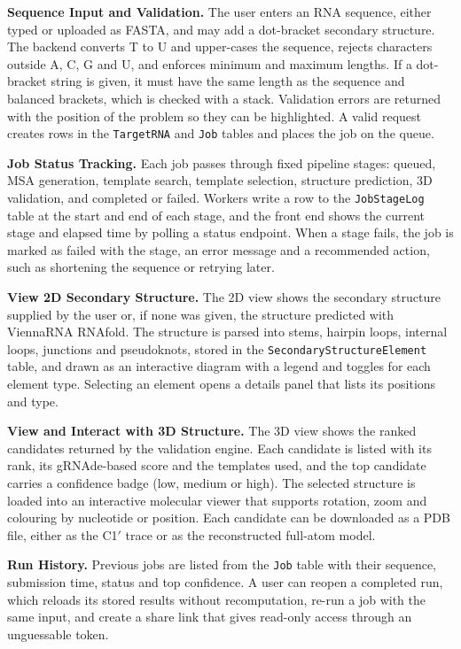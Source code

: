 \documentclass{FastFyp}
\begin{document}
\textbf{Sequence Input and Validation.} The user enters an RNA sequence, either typed or uploaded as FASTA, and may add a dot-bracket secondary structure. The backend converts T to U and upper-cases the sequence, rejects characters outside A, C, G and U, and enforces minimum and maximum lengths. If a dot-bracket string is given, it must have the same length as the sequence and balanced brackets, which is checked with a stack. Validation errors are returned with the position of the problem so they can be highlighted. A valid request creates rows in the \texttt{TargetRNA} and \texttt{Job} tables and places the job on the queue.

\textbf{Job Status Tracking.} Each job passes through fixed pipeline stages: queued, MSA generation, template search, template selection, structure prediction, 3D validation, and completed or failed. Workers write a row to the \texttt{JobStageLog} table at the start and end of each stage, and the front end shows the current stage and elapsed time by polling a status endpoint. When a stage fails, the job is marked as failed with the stage, an error message and a recommended action, such as shortening the sequence or retrying later.

\textbf{View 2D Secondary Structure.} The 2D view shows the secondary structure supplied by the user or, if none was given, the structure predicted with ViennaRNA RNAfold. The structure is parsed into stems, hairpin loops, internal loops, junctions and pseudoknots, stored in the \texttt{SecondaryStructureElement} table, and drawn as an interactive diagram with a legend and toggles for each element type. Selecting an element opens a details panel that lists its positions and type.

\textbf{View and Interact with 3D Structure.} The 3D view shows the ranked candidates returned by the validation engine. Each candidate is listed with its rank, its gRNAde-based score and the templates used, and the top candidate carries a confidence badge (low, medium or high). The selected structure is loaded into an interactive molecular viewer that supports rotation, zoom and colouring by nucleotide or position. Each candidate can be downloaded as a PDB file, either as the C1$'$ trace or as the reconstructed full-atom model.

\textbf{Run History.} Previous jobs are listed from the \texttt{Job} table with their sequence, submission time, status and top confidence. A user can reopen a completed run, which reloads its stored results without recomputation, re-run a job with the same input, and create a share link that gives read-only access through an unguessable token.
\end{document}
